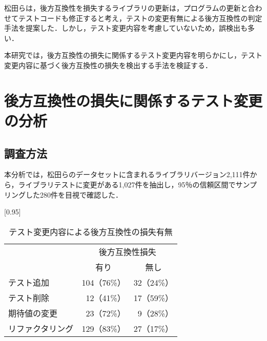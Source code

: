 \documentclass[T,J]{fose} %
\begin{document}
松田らは，後方互換性を損失するライブラリの更新は，プログラムの更新と合わせてテストコードも修正すると考え，テストの変更有無による後方互換性の判定手法を提案した\cite{matsuda}．しかし，テスト変更内容を考慮していないため，誤検出も多い．

本研究では，後方互換性の損失に関係するテスト変更内容を明らかにし，テスト変更内容に基づく後方互換性の損失を検出する手法を検証する．


\section{後方互換性の損失に関係するテスト変更の分析}\label{rq1}

\subsection{調査方法}

本分析では，松田らのデータセットに含まれるライブラリバージョン2,111件から，ライブラリテストに変更がある1,027件を抽出し，95％の信頼区間でサンプリングした280件を目視で確認した．


\begin{table}[]
\caption{テスト変更内容による後方互換性の損失有無}
\scalebox{0.95}[0.95]{
\begin{tabular}{l|r|r}
\hline
\multirow{2}{*}{\multicolumn{1}{c}{テスト変更内容}} & \multicolumn{2}{c}{後方互換性損失}  \\ \cline{2-3}
 & \multicolumn{1}{c|}{有り} & \multicolumn{1}{c}{無し} \\ \hline
テスト追加 & 104（76\%） & 32（24\%） \\ \hline
テスト削除 & 12（41\%） & 17（59\%） \\ \hline
期待値の変更 & 23（72\%） & 9（28\%） \\ \hline
リファクタリング & 129（83\%） & 27（17\%） \\ \hline
\end{tabular}
}
\label{table_test_pattern}
\end{table}
\end{document}
